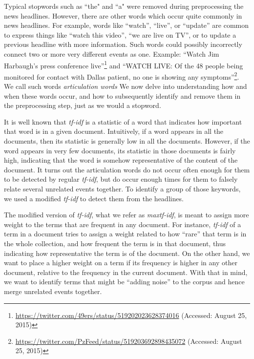 Typical stopwords such as ``the" and ``a" were removed during preprocessing
the news headlines. However, there are other words
which occur quite commonly in news headlines. For example, words like
``watch'', ``live'', or ``update'' are common to express things like
``watch this video'', ``we are live on TV'', or to update a previous
headline with more information. Such words could possibly incorrectly
connect two or more very different events as one.
Example: ``Watch Jim Harbaugh's press conference
live''\footnote{\url{https://twitter.com/49ers/status/519202023628374016}
(Accessed: August 25, 2015)}
and ``WATCH LIVE: Of the 48 people being monitored for contact with
Dallas patient, no one is showing any
symptoms''\footnote{\url{https://twitter.com/PzFeed/status/519203692898435072}
(Accessed: August 25, 2015)}.  We call such words
\emph{articulation words} 
We now delve into
understanding how and when these words occur, and how to subsequently
identify and remove them in the preprocessing step, just as we would a
stopword.

It is well known that \emph{tf-idf} \cite{Jones72astatistical} is a statistic of a word that
indicates how important that word is in a given document.  Intuitively, if a word appears
in all the documents, then its statistic is generally low in all the documents.  However,
if the word appears in very few documents, its statistic in those documents is fairly high,
indicating that the word is somehow representative of the content of the document.
It turns out the articulation words do not occur often enough for them to be detected by
regular \emph{tf-idf}, but do occur enough
times for them to falsely relate several unrelated events together. To
identify a group of those keywords, we used a modified \emph{tf-idf}
to detect them from the headlines.

The modified version of \emph{tf-idf}, what we refer as
\emph{maxtf-idf}, is meant to assign more weight to the terms that are
frequent in any document. For instance, \emph{tf-idf} of a term in a
document tries to assign a weight related to how ``rare'' that term is
in the whole collection, and how frequent the term is in that document,
thus indicating how representative the term is of the document. On the
other hand, we want to place a higher weight on a term if its frequency
is higher in any other document, relative to the frequency in the current
document. With that in mind, we want to identify terms that might be
``adding noise'' to the corpus and hence merge unrelated
events together.

